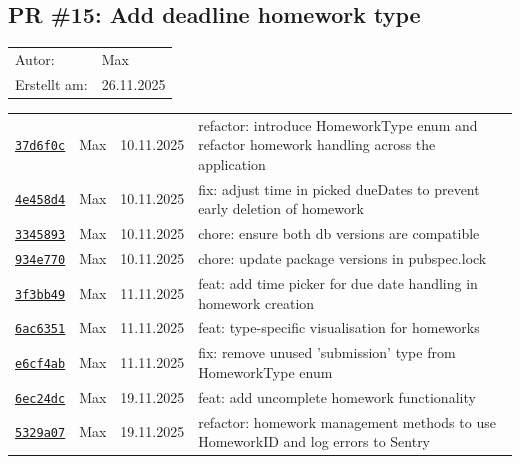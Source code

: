\documentclass{article}%
\begin{document}
\subsection{PR \#15: Add deadline homework type}%
\label{pr:15}%
\begin{tabular}{l l}%
Autor:&Max\\%
Erstellt am: &26.11.2025\\%
\end{tabular}%
\begin{longtable}{l l l p{12cm}}%
\href{https://github.com/scriptor1000/homeworks/pull/15/commits/37d6f0cbcd048cbcea57454acae6ad0133aaf29f}{\underline{\texttt{37d6f0c}}}&Max&10.11.2025&refactor: introduce HomeworkType enum and refactor homework handling across the application\\%
\href{https://github.com/scriptor1000/homeworks/pull/15/commits/4e458d4af07f5165368a739d117821a31cd4c93f}{\underline{\texttt{4e458d4}}}&Max&10.11.2025&fix: adjust time in picked dueDates to prevent early deletion of homework\\%
\href{https://github.com/scriptor1000/homeworks/pull/15/commits/3345893d56bce146bdda591a23b631e89bff6ec1}{\underline{\texttt{3345893}}}&Max&10.11.2025&chore: ensure both db versions are compatible\\%
\href{https://github.com/scriptor1000/homeworks/pull/15/commits/934e770312d838738b8ec5f3967d6951f74a0f9c}{\underline{\texttt{934e770}}}&Max&10.11.2025&chore: update package versions in pubspec.lock\\%
\href{https://github.com/scriptor1000/homeworks/pull/15/commits/3f3bb49fabacf93311cfa60492ba854896b7554a}{\underline{\texttt{3f3bb49}}}&Max&11.11.2025&feat: add time picker for due date handling in homework creation\\%
\href{https://github.com/scriptor1000/homeworks/pull/15/commits/6ac6351e2ec1ce78effdf2aabcc229f121e5f173}{\underline{\texttt{6ac6351}}}&Max&11.11.2025&feat: type{-}specific visualisation for homeworks\\%
\href{https://github.com/scriptor1000/homeworks/pull/15/commits/e6cf4abb5995763beba312273eefbb5ce059d2a8}{\underline{\texttt{e6cf4ab}}}&Max&11.11.2025&fix: remove unused 'submission' type from HomeworkType enum\\%
\href{https://github.com/scriptor1000/homeworks/pull/15/commits/6ec24dce07d417c58b776d5648790a6ba5123c76}{\underline{\texttt{6ec24dc}}}&Max&19.11.2025&feat: add uncomplete homework functionality\\%
\href{https://github.com/scriptor1000/homeworks/pull/15/commits/5329a072a6e0567b681b57d98e5bcc136e2e23d8}{\underline{\texttt{5329a07}}}&Max&19.11.2025&refactor: homework management methods to use HomeworkID and log errors to Sentry\\%

\end{longtable}
\end{document}
